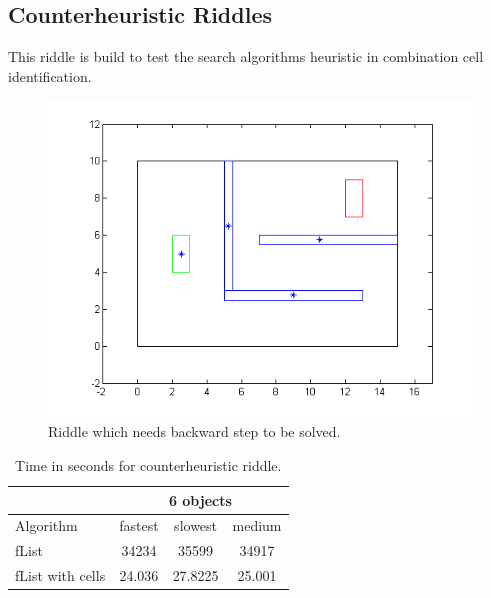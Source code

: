 \subsection{Counterheuristic Riddles}
This riddle is build to test the search algorithms heuristic in combination cell identification.\\
\begin{figure}[H]
\centering
\includegraphics[scale = 0.5]{riddleB}
\caption{Riddle which needs backward step to be solved.}
\end{figure}
\begin{table}[H]
\centering
\begin{tabular}{l||c|c|c}
& \multicolumn{3}{c||}{6 objects} \\\hline\hline
Algorithm& fastest & slowest & medium \\\hline
fList  &  34234 &  35599 & 34917 \\
fList with cells & 24.036 & 27.8225 & 25.001 \\
\end{tabular}
\caption{Time in seconds for counterheuristic riddle.}
\end{table}




